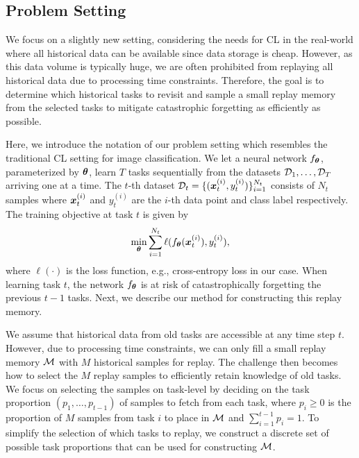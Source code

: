 
\subsection{Problem Setting}\label{paperC:sec:problem_setting}

We focus on a slightly new setting, considering the needs for CL in the real-world where all historical data can be available since data storage is cheap. 
However, as this data volume is typically huge, we are often prohibited from replaying all historical data due to processing time constraints. 
Therefore, the goal is to determine which historical tasks to revisit and sample a small replay memory from the selected tasks to mitigate catastrophic forgetting as efficiently as possible. 

\setlength{\abovedisplayskip}{0pt}
\setlength{\belowdisplayskip}{0pt}
\setlength{\abovedisplayshortskip}{0pt}
\setlength{\belowdisplayshortskip}{0pt}

Here, we introduce the notation of our problem setting which resembles the traditional CL setting for image classification. We let a neural network $f_{{\bm{\theta}}}$, parameterized by ${\bm{\theta}}$, learn $T$ tasks sequentially from the datasets ${\mathcal{D}}_1, \dots, {\mathcal{D}}_T$ arriving one at a time. 
The $t$-th dataset ${\mathcal{D}}_t = \{({\bm{x}}_{t}^{(i)}, y_{t}^{(i)})\}_{i=1}^{N_{t}}$ consists of $N_t$ samples where ${\bm{x}}_{t}^{(i)}$ and $y_{t}^{(i)}$ are the $i$-th data point and class label respectively. The training objective at task $t$ is given by 
\begin{align}
	\underset{{\bm{\theta}}}{\text{min}} \sum_{i=1}^{N_t} \ell(f_{{\bm{\theta}}}({\bm{x}}_t^{(i)}), y_{t}^{(i)}),
\end{align}
where $\ell(\cdot)$ is the loss function, e.g., cross-entropy loss in our case. 
When learning task $t$, the network $f_{{\bm{\theta}}}$ is at risk of catastrophically forgetting the previous $t-1$ tasks. Next, we describe our method for constructing this replay memory.  

We assume that historical data from old tasks are accessible at any time step $t$. 
However, due to processing time constraints, we can only fill a small replay memory ${\mathcal{M}}$ with $M$ historical samples for replay. 
The challenge then becomes how to select the $M$ replay samples to efficiently retain knowledge of old tasks. We focus on selecting the samples on task-level by deciding on the task proportion $(p_1, \dots, p_{t-1})$ of samples to fetch from each task, where $p_{i} \geq 0$ is the proportion of $M$ samples from task $i$ to place in ${\mathcal{M}}$ and $\sum_{i=1}^{t-1} p_i = 1$. To simplify the selection of which tasks to replay, we construct a discrete set of possible task proportions that can be used for constructing ${\mathcal{M}}$.

